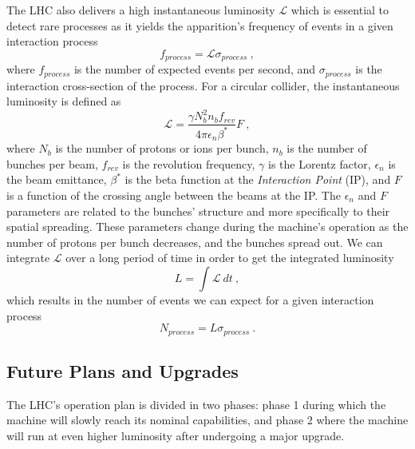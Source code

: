             The LHC also delivers a high instantaneous luminosity $ \mathcal{L} $ which is essential to detect rare processes as it yields the apparition's frequency of events in a given interaction process
            \begin{equation}
                f_{process} = \mathcal{L} \sigma_{process} \ ,
            \end{equation}
            where $ f_{process} $ is the number of expected events per second, and $ \sigma_{process} $ is the interaction cross-section of the process. For a circular collider, the instantaneous luminosity is defined as
            \begin{equation}
                \mathcal{L} = \frac{\gamma N^2_b n_b f_{rev}}{4 \pi \epsilon_n \beta^*} F \ ,
                \label{eq:lhc_cms__luminosity}
            \end{equation}
            where $ N_b $ is the number of protons or ions per bunch, $ n_b $ is the number of bunches per beam, $ f_{rev} $ is the revolution frequency, $ \gamma $ is the Lorentz factor, $ \epsilon_n $ is the beam emittance, $ \beta^* $ is the beta function at the \emph{Interaction Point} (IP), and $ F $ is a function of the crossing angle between the beams at the IP. The $ \epsilon_n $ and $ F $ parameters are related to the bunches' structure and more specifically to their spatial spreading. These parameters change during the machine's operation as the number of protons per bunch decreases, and the bunches spread out. We can integrate $ \mathcal{L} $ over a long period of time in order to get the integrated luminosity
            \begin{equation}
                L = \int \mathcal{L} \ dt \ ,
            \end{equation}
            which results in the number of events we can expect for a given interaction process
            \begin{equation}
                N_{process} = L \sigma_{process} \ .
                \label{eq:lhc_cms__N}
            \end{equation}

        \subsection{Future Plans and Upgrades}

            The LHC's operation plan is divided in two phases: phase 1 during which the machine will slowly reach its nominal capabilities, and phase 2 where the machine will run at even higher luminosity after undergoing a major upgrade. \\

